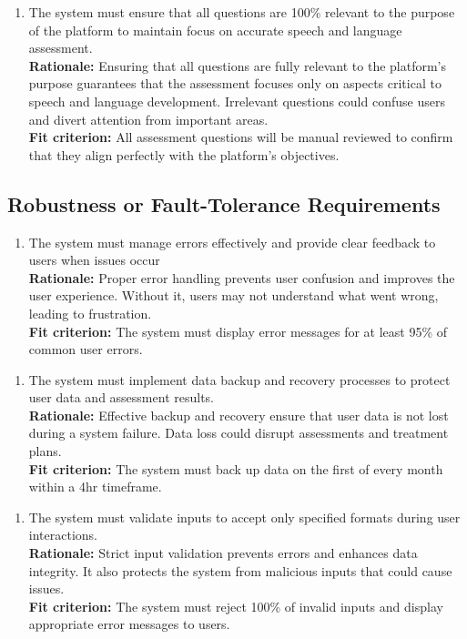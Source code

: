 \documentclass[12pt]{article}
\begin{document}
\begin{enumerate}[{PR-PA}5. ]
  \item The system must ensure that all questions are 100\% relevant to the purpose of the platform to maintain focus on accurate speech and language assessment.\\
  \textbf{Rationale: }Ensuring that all questions are fully relevant to the platform’s purpose guarantees that the assessment focuses only on aspects critical to speech and language development. Irrelevant questions could confuse users and divert attention from important areas.\\
  \textbf{Fit criterion: }All assessment questions will be manual reviewed to confirm that they align perfectly with the platform's objectives.  
\end{enumerate}

\subsection{Robustness or Fault-Tolerance Requirements}
\begin{enumerate}[{PR-RFT}1. ]
  \item The system must manage errors effectively and provide clear feedback to users when issues occur\\
  \textbf{Rationale: }Proper error handling prevents user confusion and improves the user experience. Without it, users may not understand what went wrong, leading to frustration.\\
  \textbf{Fit criterion: }The system must display error messages for at least 95\% of common user errors.  
\end{enumerate}
\begin{enumerate}[{PR-RFT}2. ]
  \item The system must implement data backup and recovery processes to protect user data and assessment results.\\
  \textbf{Rationale: }Effective backup and recovery ensure that user data is not lost during a system failure. Data loss could disrupt assessments and treatment plans.\\
  \textbf{Fit criterion: }The system must back up data on the first of every month within a 4hr timeframe.  
\end{enumerate}
\begin{enumerate}[{PR-RFT}3. ]
  \item The system must validate inputs to accept only specified formats during user interactions.\\
  \textbf{Rationale: }Strict input validation prevents errors and enhances data integrity. It also protects the system from malicious inputs that could cause issues.\\
  \textbf{Fit criterion: }The system must reject 100\% of invalid inputs and display appropriate error messages to users.  
\end{enumerate}
\end{document}
